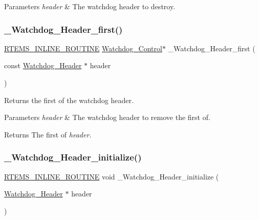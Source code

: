 \begin{DoxyParams}{Parameters}
{\em header} & The watchdog header to destroy. \\
\hline
\end{DoxyParams}
\mbox{\label{group__RTEMSScoreWatchdog_ga9b0af8778de4a421e9ef517ff371bb3b}} 
\subsubsection{\texorpdfstring{\_Watchdog\_Header\_first()}{\_Watchdog\_Header\_first()}}
{\footnotesize\ttfamily \mbox{\hyperlink{group__RTEMSScoreBaseDefs_gac216239df231d5dbd15e3520b0b9313f}{R\+T\+E\+M\+S\+\_\+\+I\+N\+L\+I\+N\+E\+\_\+\+R\+O\+U\+T\+I\+NE}} \mbox{\hyperlink{structWatchdog__Control}{Watchdog\+\_\+\+Control}}$\ast$ \+\_\+\+Watchdog\+\_\+\+Header\+\_\+first (\begin{DoxyParamCaption}\item[{const \mbox{\hyperlink{structWatchdog__Header}{Watchdog\+\_\+\+Header}} $\ast$}]{header }\end{DoxyParamCaption})}



Returns the first of the watchdog header. 


\begin{DoxyParams}{Parameters}
{\em header} & The watchdog header to remove the first of.\\
\hline
\end{DoxyParams}
\begin{DoxyReturn}{Returns}
The first of {\itshape header}. 
\end{DoxyReturn}
\mbox{\label{group__RTEMSScoreWatchdog_ga6566cd6322fc45173038e64d3232dc0b}} 
\subsubsection{\texorpdfstring{\_Watchdog\_Header\_initialize()}{\_Watchdog\_Header\_initialize()}}
{\footnotesize\ttfamily \mbox{\hyperlink{group__RTEMSScoreBaseDefs_gac216239df231d5dbd15e3520b0b9313f}{R\+T\+E\+M\+S\+\_\+\+I\+N\+L\+I\+N\+E\+\_\+\+R\+O\+U\+T\+I\+NE}} void \+\_\+\+Watchdog\+\_\+\+Header\+\_\+initialize (\begin{DoxyParamCaption}\item[{\mbox{\hyperlink{structWatchdog__Header}{Watchdog\+\_\+\+Header}} $\ast$}]{header }\end{DoxyParamCaption})}



